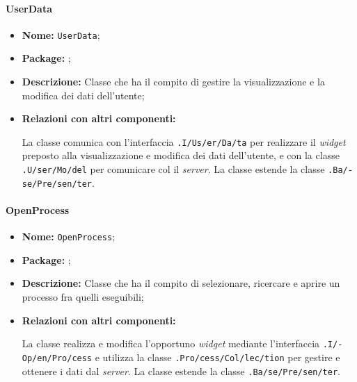 \paragraph{UserData}
\begin{flushleft}
\begin{itemize}
\item \textbf{Nome:} \texttt{UserData};
\item \textbf{Package:} \texttt{\logicUser};
\item \textbf{Descrizione:} Classe che ha il compito di gestire la visualizzazione e la modifica dei dati dell'utente;
\item \textbf{Relazioni con altri componenti:}
\begin{sloppypar}
La classe comunica con l'interfaccia \texttt{\viewUser{}.I\fshyp{}Us\fshyp{}er\fshyp{}Da\fshyp{}ta} per realizzare il \textit{widget} preposto alla visualizzazione e modifica dei dati dell'utente, e con la classe \texttt{\model{}.U\fshyp{}ser\fshyp{}Mo\fshyp{}del} per comunicare col il \textit{server}.
La classe estende la classe \texttt{\logic{}.Ba\fshyp{}se\fshyp{}Pre\fshyp{}sen\fshyp{}ter}.\end{sloppypar}
\end{itemize}
\end{flushleft}

\paragraph{OpenProcess}
\begin{flushleft}
\begin{itemize}
\item \textbf{Nome:} \texttt{OpenProcess};
\item \textbf{Package:} \texttt{\logicUser};
\item \textbf{Descrizione:} Classe che ha il compito di selezionare, ricercare e aprire un processo fra quelli eseguibili;
\item \textbf{Relazioni con altri componenti:}
\begin{sloppypar}
La classe realizza e modifica l'opportuno \textit{widget} mediante l'interfaccia \texttt{\viewUser{}.I\fshyp{}Op\fshyp{}en\fshyp{}Pro\fshyp{}cess} e utilizza la classe \texttt{\collectionu{}.Pro\fshyp{}cess\fshyp{}Col\fshyp{}lec\fshyp{}tion} per gestire e ottenere i dati dal \textit{server}.
La classe estende la classe \texttt{\logic{}.Ba\fshyp{}se\fshyp{}Pre\fshyp{}sen\fshyp{}ter}.
\end{sloppypar}
\end{itemize}
\end{flushleft}

